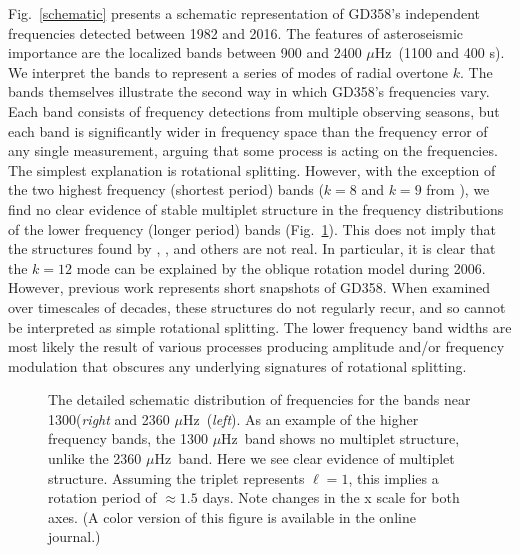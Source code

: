 \documentclass[12pt,preprint]{aastex}
\newcommand{\muHz}{\mbox{$\mu$Hz}}
\begin{document}
Fig.~\ref{schematic} presents a schematic representation of GD358's 
independent frequencies detected between 1982 and 2016.  
The features of asteroseismic importance are the localized bands between 900 and 2400
\muHz\ (1100 and 400 s). We interpret the bands to represent a series of modes of radial overtone $k$. The bands
themselves illustrate the second way in which GD358's frequencies vary. Each band consists of 
frequency detections from multiple observing seasons, but each band is significantly wider in 
frequency space than the frequency error of any single measurement, arguing that some process 
is acting on the frequencies. The simplest explanation is rotational splitting.  However, with the 
exception of the two highest frequency (shortest period) bands ($k=8$ and $k=9$ 
from \citet{Provencal09}), we find no clear evidence of stable multiplet structure in the frequency 
distributions of the lower frequency (longer period) bands (Fig.~\ref{rot}). This does not imply that the 
structures found by \cite{Winget94}, \cite{Kepler03}, \cite{Montgomery10} and others are not real. In 
particular, it is clear that the $k=12$ mode can be explained by the oblique rotation model during 2006. However, 
previous work represents short snapshots of GD358. When examined over timescales of decades, these structures 
do not regularly recur, and so cannot be interpreted as simple rotational splitting. The lower frequency band widths 
are most likely the result of various processes producing amplitude and/or frequency modulation that obscures any 
underlying signatures of rotational splitting. 
\begin{figure}
 \caption{The detailed schematic distribution of frequencies for the bands near 1300({\em{right}}
 and 2360 \muHz\ ({\em{left}}). As an example of the higher frequency bands, the 1300 \muHz\ band 
 shows no multiplet structure, unlike the 2360 \muHz\ band. Here we see clear evidence of multiplet 
 structure. Assuming the triplet represents
 $\ell=1$, this implies a rotation period of $\approx 1.5$ days. Note changes in the x scale for both axes.
 (A color version of this figure is available in the online journal.)
 \label{rot}}
\end{figure}
\end{document}
